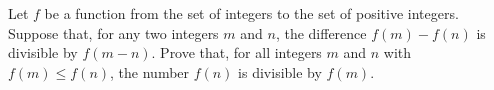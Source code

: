 Let $f$ be a function from the set of integers to the set of positive integers. Suppose that, for any two integers $m$ and $n$,  the difference $f(m) - f(n)$ is divisible by $f(m- n)$. Prove that, for all integers $m$ and $n$ with $f(m) \leq f(n)$,  the number $f(n)$ is divisible by $f(m)$.